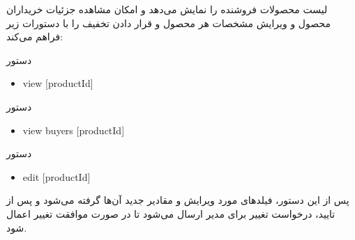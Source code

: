 \documentclass[]{article}
\begin{document}
لیست محصولات فروشنده را نمایش می‌دهد و امکان مشاهده جزئیات خریداران محصول و ویرایش مشخصات هر محصول و قرار دادن تخفیف را با دستورات زیر فراهم می‌کند:


\begin{mybox}[colback=brilliantlavender]{دستور}

\begin{latin}

\begin{itemize}[label = {$\Rightarrow$}]

\item
view [productId]

\end{itemize}

\end{latin}

\end{mybox}

\begin{mybox}[colback=brilliantlavender]{دستور}

\begin{latin}

\begin{itemize}[label = {$\Rightarrow$}]

\item
view buyers [productId]

\end{itemize}

\end{latin}

\end{mybox}

\begin{mybox}[colback=brilliantlavender]{دستور}

\begin{latin}

\begin{itemize}[label = {$\Rightarrow$}]

\item
edit [productId]

\end{itemize}

\end{latin}

\end{mybox}

 پس از این دستور، فیلد‌های مورد ویرایش و مقادیر جدید آن‌ها گرفته می‌شود و پس از تایید، درخواست تغییر برای مدیر ارسال می‌شود تا در صورت موافقت تغییر اعمال شود.

\hrulefill
\end{document}
